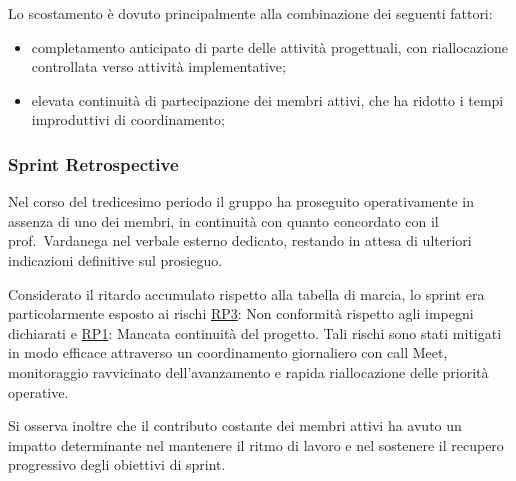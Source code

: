 \documentclass[a4paper, 11pt, oneside]{scrartcl} %
\begin{document}
Lo scostamento è dovuto principalmente alla combinazione dei seguenti fattori:
\begin{itemize}[noitemsep, topsep=2pt]
    \item completamento anticipato di parte delle attività progettuali, con riallocazione controllata verso attività implementative;
    \item elevata continuità di partecipazione dei membri attivi, che ha ridotto i tempi improduttivi di coordinamento;
\end{itemize}

\subsubsection*{Sprint Retrospective}

Nel corso del tredicesimo periodo il gruppo ha proseguito operativamente in assenza di uno dei membri, in continuità con quanto concordato con il prof.~Vardanega nel verbale esterno dedicato, restando in attesa di ulteriori indicazioni definitive sul prosieguo.

Considerato il ritardo accumulato rispetto alla tabella di marcia, lo sprint era particolarmente esposto ai rischi \hyperref[sec:rp3]{RP3}: Non conformità rispetto agli impegni dichiarati e \hyperref[sec:rp1]{RP1}: Mancata continuità del progetto. Tali rischi sono stati mitigati in modo efficace attraverso un coordinamento giornaliero con call Meet, monitoraggio ravvicinato dell'avanzamento e rapida riallocazione delle priorità operative.

Si osserva inoltre che il contributo costante dei membri attivi ha avuto un impatto determinante nel mantenere il ritmo di lavoro e nel sostenere il recupero progressivo degli obiettivi di sprint.
\end{document}
